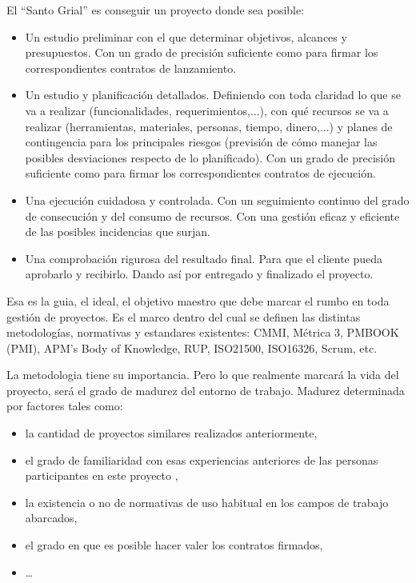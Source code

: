 \documentclass[spanish,12pt,a4paper,final,oneside]{book}
\begin{document}
El ``Santo Grial'' es conseguir un proyecto donde sea posible:
\begin{itemize}
\item Un estudio preliminar con el que determinar objetivos, alcances y presupuestos. Con un grado de precisión suficiente como para firmar los correspondientes contratos de lanzamiento.
\item Un estudio y planificación detallados. Definiendo con toda claridad lo que se va a realizar (funcionalidades, requerimientos,...), con qué recursos se va a realizar (herramientas, materiales, personas, tiempo, dinero,...) y planes de contingencia para los principales riesgos (previsión de cómo manejar las posibles desviaciones respecto de lo planificado). Con un grado de precisión suficiente como para firmar los correspondientes contratos de ejecución.
\item Una ejecución cuidadosa y controlada. Con un seguimiento continuo del grado de consecución y del consumo de recursos. Con una gestión eficaz y eficiente de las posibles incidencias que surjan.
\item Una comprobación rigurosa del resultado final. Para que el cliente pueda aprobarlo y recibirlo. Dando así por entregado y finalizado el proyecto.
\end{itemize}

Esa es la guia, el ideal, el objetivo maestro que debe marcar el rumbo en toda gestión de proyectos. Es el marco dentro del cual se definen las distintas metodologías, normativas y estandares existentes: CMMI, Métrica 3, PMBOOK (PMI), APM’s Body of Knowledge, RUP, ISO21500, ISO16326, Scrum, etc.

La metodologia tiene su importancia. Pero lo que realmente marcará la vida del proyecto, será el grado de madurez del entorno de trabajo. Madurez determinada por factores tales como: 
\begin{itemize}
\item la cantidad de proyectos similares realizados anteriormente, 
\item el grado de familiaridad con esas experiencias anteriores de las personas participantes en este proyecto , 
\item la existencia o no de normativas de uso habitual en los campos de trabajo abarcados, 
\item el grado en que es posible hacer valer los contratos firmados,
\item \ldots
\end{itemize}
\end{document}
